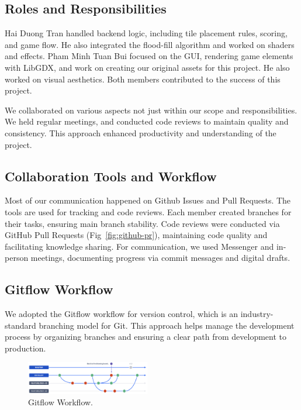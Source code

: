 \documentclass[conference]{IEEEtran}
\begin{document}
\subsection{Roles and Responsibilities}
Hai Duong Tran handled backend logic, including tile placement rules, scoring,
and game flow. He also integrated the flood-fill algorithm and worked on
shaders and effects. Pham Minh Tuan Bui focused on the GUI, rendering game
elements with LibGDX, and work on creating our original assets for this
project. He also worked on visual aesthetics. Both members contributed to the
success of this project.

We collaborated on various aspects not just within our scope and
responsibilities. We held regular meetings, and conducted code reviews to
maintain quality and consistency. This approach enhanced productivity and
understanding of the project.

\subsection{Collaboration Tools and Workflow}
Most of our communication happened on Github Issues and Pull Requests. The
tools are used for tracking and code reviews. Each member created branches for
their tasks, ensuring main branch stability. Code reviews were conducted via
GitHub Pull Requests (Fig~\ref{fig:github-pr}), maintaining code quality and
facilitating knowledge sharing. For communication, we used Messenger and
in-person meetings, documenting progress via commit messages and digital
drafts.

\subsection{Gitflow Workflow}
We adopted the Gitflow workflow for version control, which is an
industry-standard branching model for Git. This approach helps manage the
development process by organizing branches and ensuring a clear path from
development to production.

\begin{figure}[htbp]
    \centerline{\includegraphics[width=0.48\textwidth]{assets/gitflow.png}}
    \caption{Gitflow Workflow.}\label{fig:gitflow}
\end{figure}
\end{document}
